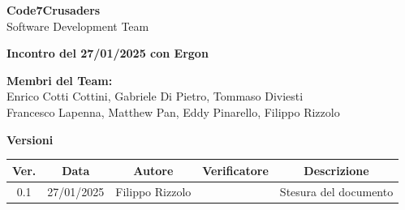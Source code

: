 \documentclass{article}
\begin{document}
\begin{titlepage}
    {\Huge \textbf{Code7Crusaders}}\\
    \vspace{0.5cm}
    {\Large Software Development Team}\\
    \vspace{2cm}
    
    {\large \textbf{Incontro del 27/01/2025 con Ergon}}\\ %
    \vspace{5cm}                           %
    
    
    \textbf{Membri del Team:}\\
    Enrico Cotti Cottini, Gabriele Di Pietro, Tommaso Diviesti \\
    Francesco Lapenna, Matthew Pan, Eddy Pinarello, Filippo Rizzolo \\
    \vspace{0.5cm}
    
    \vspace{1cm}
\end{titlepage}



\newpage
\begin{table}[h!]
\centering
\textbf{Versioni} \\ %
\vspace{2mm} %
\begin{tabular}{|c|c|c|c|c|}
    \hline
    \textbf{Ver.} & \textbf{Data} & \textbf{Autore} & \textbf{Verificatore} & \textbf{Descrizione} \\
    \hline
    0.1 & 27/01/2025 & Filippo Rizzolo &  & Stesura del documento \\ 
    \hline                                  %
\end{tabular}
\end{table}



\newpage
\tableofcontents
\end{document}
